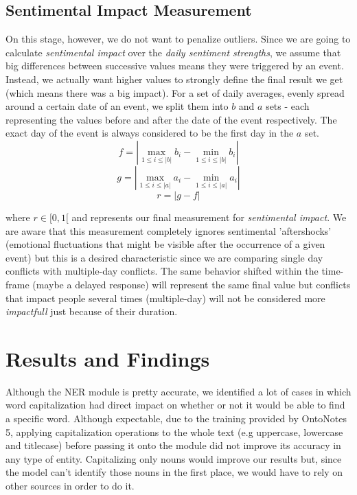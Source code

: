 \documentclass[11pt]{article}
\begin{document}
	\subsection{Sentimental Impact Measurement}
	\label{sub:sentimental_impact_measurement}
	On this stage, however, we do not want to penalize outliers. Since we are going to calculate \textit{sentimental impact} over the \textit{daily sentiment strengths}, we assume that big differences between successive values means they were triggered by an event. Instead, we actually want higher values to strongly define the final result we get (which means there was a big impact). 
	For a set of daily averages, evenly spread around a certain date of an event, we split them into $b$ and $a$ sets - each representing the values before and after the date of the event respectively. The exact day of the event is always considered to be the first day in the $a$ set.
	\begin{equation}
	f = |\max_{1 \leq i \leq |b|} b_{i} - \min_{1 \leq i \leq |b|} b_{i}|
	\end{equation}
	\begin{equation}
	g = |\max_{1 \leq i \leq |a|} a_{i} - \min_{1 \leq i \leq |a|} a_{i}|
	\end{equation}
	\begin{equation}
	r = |g - f|
	\end{equation}
	
	where $r \in [0, 1[$ and represents our final measurement for \textit{sentimental impact}. We are aware that this measurement completely ignores sentimental 'aftershocks' (emotional fluctuations that might be visible after the occurrence of a given event) but this is a desired characteristic since we are comparing single day conflicts with multiple-day conflicts. The same behavior shifted within the time-frame (maybe a delayed response) will represent the same final value but conflicts that impact people several times (multiple-day) will not be considered more \textit{impactfull} just because of their duration.
	
	\section{Results and Findings}
	Although the NER module is pretty accurate, we identified a lot of cases in which word capitalization had direct impact on whether or not it would be able to find a specific word. Although expectable, due to the training provided by OntoNotes 5, applying capitalization operations to the whole text (e.g uppercase, lowercase and titlecase) before passing it onto the module did not improve its accuracy in any type of entity. Capitalizing only nouns would improve our results but, since the model can't identify those nouns in the first place, we would have to rely on other sources in order to do it.
	
\end{document}
